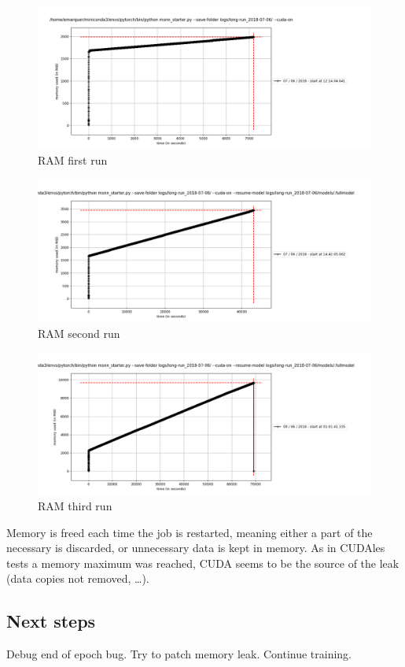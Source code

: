 \begin{figure}[h]
\centering
\includegraphics[width=\textwidth]{parts/appendix/reports-gmsnn/docs_esteban-latex/test_reports/2018-06-11/RAM.png}
\caption{RAM first run}
\end{figure}

\begin{figure}[h]
\centering
\includegraphics[width=\textwidth]{parts/appendix/reports-gmsnn/docs_esteban-latex/test_reports/2018-06-11/RAM_restart-1.png}
\caption{RAM second run}
\end{figure}

\begin{figure}[h]
\centering
\includegraphics[width=\textwidth]{parts/appendix/reports-gmsnn/docs_esteban-latex/test_reports/2018-06-11/RAM_restart-2.png}
\caption{RAM third run}
\end{figure}

Memory is freed each time the job is restarted, meaning either a part of
the necessary is discarded, or unnecessary data is kept in memory. As in
CUDAles tests a memory maximum was reached, CUDA seems to be the source
of the leak (data copies not removed, \ldots{}).

\subsection{Next steps}

Debug end of epoch bug. Try to patch memory leak. Continue training.
